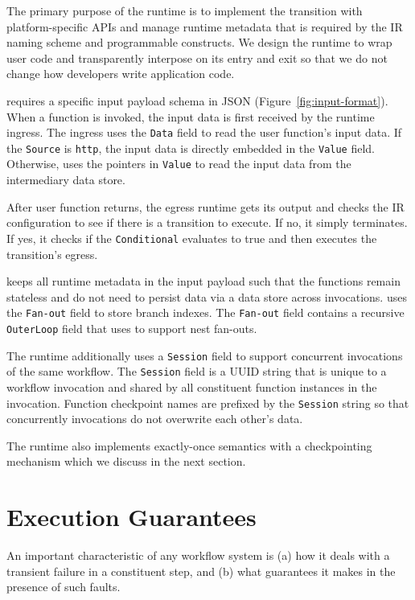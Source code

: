 The primary purpose of the \name{} runtime is to implement the transition with
platform-specific APIs and manage runtime metadata that is required by the
\name{} IR naming scheme and programmable constructs. We design the runtime to
wrap user code and transparently interpose on its entry and exit so that we do
not change how developers write application code.

 \name{} requires a specific input payload schema in JSON
(Figure~\ref{fig:input-format}). When a function is invoked, the input data is
first received by the runtime ingress. The ingress uses the \texttt{Data}
field to read the user function's input data. If the \texttt{Source} is
\texttt{http}, the input data is directly embedded in the \texttt{Value}
field. Otherwise, \name{} uses the pointers in \texttt{Value} to read the
input data from the intermediary data store.

After user function returns, the egress runtime gets its output and checks the
IR configuration to see if there is a transition to execute. If no, it simply
terminates. If yes, it checks if the \texttt{Conditional} evaluates to true
and then executes the transition's egress.

\name{} keeps all runtime metadata in the input payload such that the
functions remain stateless and do not need to persist data via a data store
across invocations. \name{} uses the \texttt{Fan-out} field to store branch
indexes. The \texttt{Fan-out} field contains a recursive \texttt{OuterLoop}
field that \name{} uses to support nest fan-outs.

The runtime additionally uses a \texttt{Session} field to support concurrent
invocations of the same workflow. The \texttt{Session} field is a UUID string
that is unique to a workflow invocation and shared by all constituent function
instances in the invocation. Function checkpoint names are prefixed by the
\texttt{Session} string so that concurrently invocations do not overwrite each
other's data.

The \name{} runtime also implements exactly-once semantics with a
checkpointing mechanism which we discuss in the next section.


\section{Execution Guarantees}

An important characteristic of any workflow system 
is (a) how it deals with  a transient failure in a constituent step, and 
(b) what guarantees it makes in the presence of such faults.
 
